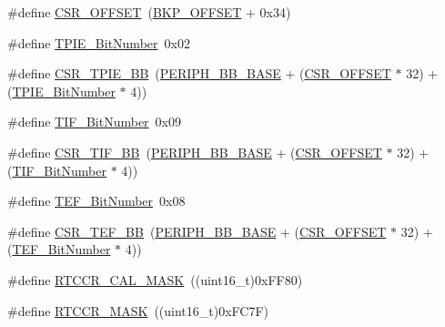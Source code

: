 \begin{DoxyCompactItemize}
\item 
\#define \mbox{\hyperlink{group___b_k_p___private___defines_ga984cbe73312b6d3d355c5053763d499a}{C\+S\+R\+\_\+\+O\+F\+F\+S\+ET}}~(\mbox{\hyperlink{group___b_k_p___private___defines_gaaaf71f474657e7c0c5b0d6ba9697cf5d}{B\+K\+P\+\_\+\+O\+F\+F\+S\+ET}} + 0x34)
\item 
\#define \mbox{\hyperlink{group___b_k_p___private___defines_gac62e6ae9548498efa47fb72637545117}{T\+P\+I\+E\+\_\+\+Bit\+Number}}~0x02
\item 
\#define \mbox{\hyperlink{group___b_k_p___private___defines_ga1f6dcf729994613b21f554ca371d393c}{C\+S\+R\+\_\+\+T\+P\+I\+E\+\_\+\+BB}}~(\mbox{\hyperlink{group___peripheral__memory__map_gaed7efc100877000845c236ccdc9e144a}{P\+E\+R\+I\+P\+H\+\_\+\+B\+B\+\_\+\+B\+A\+SE}} + (\mbox{\hyperlink{group___r_c_c___private___defines_ga984cbe73312b6d3d355c5053763d499a}{C\+S\+R\+\_\+\+O\+F\+F\+S\+ET}} $\ast$ 32) + (\mbox{\hyperlink{group___b_k_p___private___defines_gac62e6ae9548498efa47fb72637545117}{T\+P\+I\+E\+\_\+\+Bit\+Number}} $\ast$ 4))
\item 
\#define \mbox{\hyperlink{group___b_k_p___private___defines_gac8b1b82c7029c05e720c50585762bcf2}{T\+I\+F\+\_\+\+Bit\+Number}}~0x09
\item 
\#define \mbox{\hyperlink{group___b_k_p___private___defines_ga8d9e7cac2321fae6d257e8c1316264e3}{C\+S\+R\+\_\+\+T\+I\+F\+\_\+\+BB}}~(\mbox{\hyperlink{group___peripheral__memory__map_gaed7efc100877000845c236ccdc9e144a}{P\+E\+R\+I\+P\+H\+\_\+\+B\+B\+\_\+\+B\+A\+SE}} + (\mbox{\hyperlink{group___r_c_c___private___defines_ga984cbe73312b6d3d355c5053763d499a}{C\+S\+R\+\_\+\+O\+F\+F\+S\+ET}} $\ast$ 32) + (\mbox{\hyperlink{group___b_k_p___private___defines_gac8b1b82c7029c05e720c50585762bcf2}{T\+I\+F\+\_\+\+Bit\+Number}} $\ast$ 4))
\item 
\#define \mbox{\hyperlink{group___b_k_p___private___defines_gaeb8676e7543d93df60cf7c63fd795672}{T\+E\+F\+\_\+\+Bit\+Number}}~0x08
\item 
\#define \mbox{\hyperlink{group___b_k_p___private___defines_gad60539cc791a26701d414aee529ea203}{C\+S\+R\+\_\+\+T\+E\+F\+\_\+\+BB}}~(\mbox{\hyperlink{group___peripheral__memory__map_gaed7efc100877000845c236ccdc9e144a}{P\+E\+R\+I\+P\+H\+\_\+\+B\+B\+\_\+\+B\+A\+SE}} + (\mbox{\hyperlink{group___r_c_c___private___defines_ga984cbe73312b6d3d355c5053763d499a}{C\+S\+R\+\_\+\+O\+F\+F\+S\+ET}} $\ast$ 32) + (\mbox{\hyperlink{group___b_k_p___private___defines_gaeb8676e7543d93df60cf7c63fd795672}{T\+E\+F\+\_\+\+Bit\+Number}} $\ast$ 4))
\item 
\#define \mbox{\hyperlink{group___b_k_p___private___defines_ga61a540c5dd9d18e936b8fd3e01f7f6ff}{R\+T\+C\+C\+R\+\_\+\+C\+A\+L\+\_\+\+M\+A\+SK}}~((uint16\+\_\+t)0x\+F\+F80)
\item 
\#define \mbox{\hyperlink{group___b_k_p___private___defines_ga4bda91755d5ae28e9e487e946917a1ec}{R\+T\+C\+C\+R\+\_\+\+M\+A\+SK}}~((uint16\+\_\+t)0x\+F\+C7\+F)
\end{DoxyCompactItemize}



